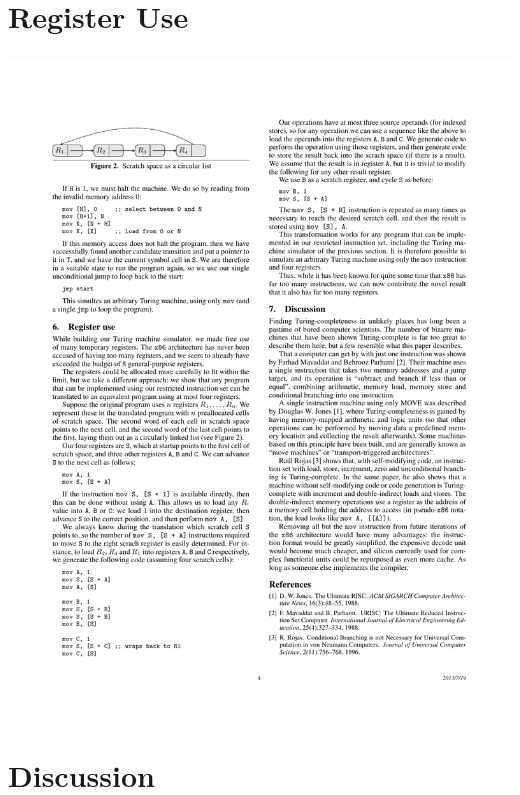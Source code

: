 \documentclass{beamer}
\begin{document}
%

\section{Register Use}

\begin{frame}[fragile]
\frametitle{}

\begin{center}
\includegraphics[scale=0.5]{figures/scratchspace}
\end{center}
\end{frame}

\section{Discussion}

%
\end{document}
